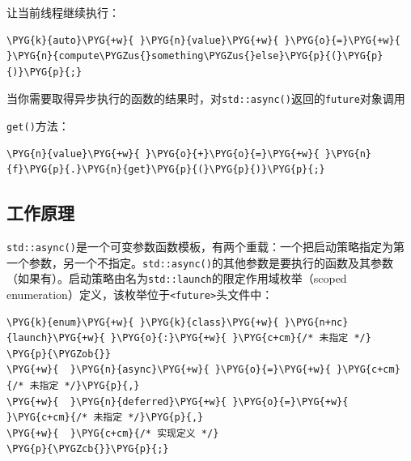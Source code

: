 
让当前线程继续执行：



\begin{codeblockbg}
\begin{Verbatim}[commandchars=\\\{\},breaklines=true,breakanywhere=true,fontsize=\codefont,xleftmargin=17bp]
\PYG{k}{auto}\PYG{+w}{ }\PYG{n}{value}\PYG{+w}{ }\PYG{o}{=}\PYG{+w}{ }\PYG{n}{compute\PYGZus{}something\PYGZus{}else}\PYG{p}{(}\PYG{p}{)}\PYG{p}{;}
\end{Verbatim}
\end{codeblockbg}



当你需要取得异步执行的函数的结果时，对\texttt{std::\allowbreak{}async()}返回的\texttt{future}对象调用



\texttt{get()}方法：



\begin{codeblockbg}
\begin{Verbatim}[commandchars=\\\{\},breaklines=true,breakanywhere=true,fontsize=\codefont,xleftmargin=17bp]
\PYG{n}{value}\PYG{+w}{ }\PYG{o}{+}\PYG{o}{=}\PYG{+w}{ }\PYG{n}{f}\PYG{p}{.}\PYG{n}{get}\PYG{p}{(}\PYG{p}{)}\PYG{p}{;}
\end{Verbatim}
\end{codeblockbg}



\subsection{工作原理}



\texttt{std::\allowbreak{}async()}是一个可变参数函数模板，有两个重载：一个把启动策略指定为第一个参数，另一个不指定。\texttt{std::\allowbreak{}async()}的其他参数是要执行的函数及其参数（如果有）。启动策略由名为\texttt{std::\allowbreak{}launch}的限定作用域枚举（scoped enumeration）定义，该枚举位于\texttt{<\allowbreak{}future>}头文件中：



\begin{codeblockbg}
\begin{Verbatim}[commandchars=\\\{\},breaklines=true,breakanywhere=true,fontsize=\codefont,xleftmargin=17bp]
\PYG{k}{enum}\PYG{+w}{ }\PYG{k}{class}\PYG{+w}{ }\PYG{n+nc}{launch}\PYG{+w}{ }\PYG{o}{:}\PYG{+w}{ }\PYG{c+cm}{/* 未指定 */}
\PYG{p}{\PYGZob{}}
\PYG{+w}{  }\PYG{n}{async}\PYG{+w}{ }\PYG{o}{=}\PYG{+w}{ }\PYG{c+cm}{/* 未指定 */}\PYG{p}{,}
\PYG{+w}{  }\PYG{n}{deferred}\PYG{+w}{ }\PYG{o}{=}\PYG{+w}{ }\PYG{c+cm}{/* 未指定 */}\PYG{p}{,}
\PYG{+w}{  }\PYG{c+cm}{/* 实现定义 */}
\PYG{p}{\PYGZcb{}}\PYG{p}{;}
\end{Verbatim}
\end{codeblockbg}


